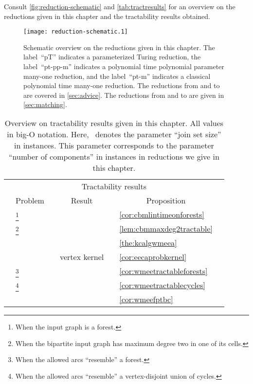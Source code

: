 Consult \autoref{fig:reduction-schematic} and \autoref{tab:tractresults} for an overview on the reductions given in this chapter and the tractability results obtained.
\begin{figure}\begin{center}
    \texttt{[image: reduction-schematic.1]}
    \caption{Schematic overview on the reductions given in this chapter. The label~``pT'' indicates a parameterized Turing reduction, the label~``pt-pp-m'' indicates a polynomial time polynomial parameter many-one reduction, and the label~``pt-m'' indicates a classical polynomial time many-one reduction. The reductions from and to \pWMEEs{} are covered in \autoref{sec:advice}. The reductions from and to \pCBMs{} are given in \autoref{sec:matching}.}
    \label{fig:reduction-schematic}
  \end{center}
\end{figure}\begin{table}
  \begin{minipage}{\linewidth}
  \centering
  \begin{tabularx}{\textwidth}{X l X l X l X} \toprule
    & \multicolumn{5}{c}{Tractability results} & \\
& \multicolumn{1}{c}{Problem} && \multicolumn{1}{c}{Result} && \multicolumn{1}{c}{Proposition} & \\
\midrule
    & \pCBMs{}\footnote{When the input graph is a forest.}  &&  && \autoref{cor:cbmlintimeonforests} \\
    & \pCBMs{}\footnote{When the bipartite input graph has maximum degree two in one of its cells.} &&  && \autoref{lem:cbmmaxdeg2tractable}  \\
    & \pWMEECAs{} &&  && \autoref{the:kcalgwmeea} \\
    & \pWMEEAs{} &&  vertex kernel && \autoref{cor:eecaprobkernel} \\
    & \pWMEEs{}\footnote{When the allowed arcs ``resemble'' a forest.} &&  && \autoref{cor:wmeetractableforests}  \\
    & \pWMEEs{}\footnote{When the allowed arcs ``resemble'' a vertex-disjoint union of cycles.} &&  && \autoref{cor:wmeetractablecycles}  \\
    & \pWMEEs{} &&  && \autoref{cor:wmeefptbc}  \\
    \bottomrule
  \end{tabularx}
  \caption{Overview on tractability results given in this chapter. All values in big-O notation. Here,~ denotes the parameter ``join set size'' in \pCBMs{} instances. This parameter corresponds to the parameter ``number of components'' in \pWMEEs{} instances in reductions we give in this chapter.}
  \label{tab:tractresults}
\end{minipage}
\end{table}


